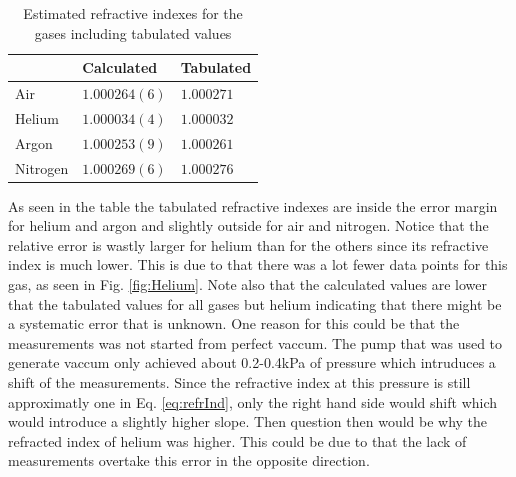 \begin{table}[H]
  \centering
  \caption{Estimated refractive indexes for the gases including tabulated values}
  \label{tab:refrIndex}
  \begin{tabular}{l|l|l}%
          & Calculated & Tabulated  \\ \hline %
    Air      & $1.000264(6)$  & $1.000271$ \cite{idxAir} \\ %
    Helium   & $1.000034(4)$  & $1.000032$ \cite{idxHeli} \\ %
    Argon    & $1.000253(9)$  & $1.000261$ \cite{idxArg} \\ %
    Nitrogen & $1.000269(6)$  & $1.000276$ \cite{idxNit} \\ %
  \end{tabular}
\end{table}

As seen in the table the tabulated refractive indexes are inside the error margin for helium and argon and slightly outside for air and nitrogen. Notice that the relative error is wastly larger for helium than for the others since its refractive index is much lower. This is due to that there was a lot fewer data points for this gas, as seen in Fig. \ref{fig:Helium}. Note also that the calculated values are lower that the tabulated values for all gases but helium indicating that there might be a systematic error that is unknown. One reason for this could be that the measurements was not started from perfect vaccum. The pump that was used to generate vaccum only achieved about 0.2-0.4kPa of pressure which intruduces a shift of the measurements. Since the refractive index at this pressure is still approximatly one in Eq. \ref{eq:refrInd}, only the right hand side would shift which would introduce a slightly higher slope. Then question then would be why the refracted index of helium was higher. This could be due to that the lack of measurements overtake this error in the opposite direction.



